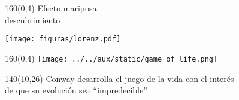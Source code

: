 \documentclass[shownotes,aspectratio=169]{beamer}
\begin{document}
\begin{frame}[plain]
 \begin{textblock}{160}(0,4)
 \centering \LARGE
 Efecto mariposa \\  \Large descubrimiento
\end{textblock}
\vspace{1cm}
% 

\centering
  \texttt{[image: figuras/lorenz.pdf]}

\end{frame}

\begin{frame}[plain]
 \begin{textblock}{160}(0,4)
 \centering \LARGE
  \texttt{[image: ../../aux/static/game\_of\_life.png]}
\end{textblock}


 \begin{textblock}{140}(10,26)
 \centering
Conway desarrolla el juego de la vida con el interés \\ de que su evolución sea ``impredecible''.  
 \end{textblock}


\end{frame}
\end{document}
